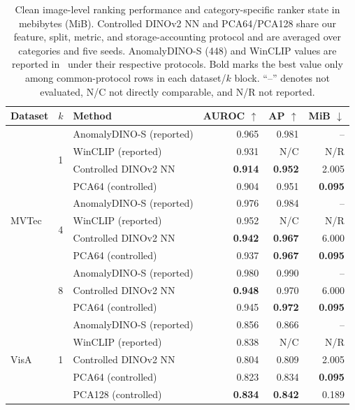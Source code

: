 \begin{table}[pos=t]
\centering
\caption{Clean image-level ranking performance and category-specific ranker state in mebibytes (MiB). Controlled DINOv2 NN and PCA64/PCA128 share our feature, split, metric, and storage-accounting protocol and are averaged over categories and five seeds. AnomalyDINO-S (448) and WinCLIP values are reported in~\cite{damm2025anomalydino,winclip2023} under their respective protocols. Bold marks the best value only among common-protocol rows in each dataset/$k$ block. ``--'' denotes not evaluated, N/C not directly comparable, and N/R not reported.}
\label{tab:clean-efficiency}
\setlength{\tabcolsep}{2.4pt}
\footnotesize
\begin{tabular}{lllrrr}
\toprule
Dataset & $k$ & Method & AUROC $\uparrow$ & AP $\uparrow$ & MiB $\downarrow$ \\
\midrule
\multirow{11}{*}{MVTec}
& \multirow{4}{*}{1} & AnomalyDINO-S (reported) & 0.965 & 0.981 & -- \\
& & WinCLIP (reported) & 0.931 & N/C & N/R \\
& & Controlled DINOv2 NN & \textbf{0.914} & \textbf{0.952} & 2.005 \\
& & PCA64 (controlled) & 0.904 & 0.951 & \textbf{0.095} \\
\cmidrule(lr){2-6}
& \multirow{4}{*}{4} & AnomalyDINO-S (reported) & 0.976 & 0.984 & -- \\
& & WinCLIP (reported) & 0.952 & N/C & N/R \\
& & Controlled DINOv2 NN & \textbf{0.942} & \textbf{0.967} & 6.000 \\
& & PCA64 (controlled) & 0.937 & \textbf{0.967} & \textbf{0.095} \\
\cmidrule(lr){2-6}
& \multirow{3}{*}{8} & AnomalyDINO-S (reported) & 0.980 & 0.990 & -- \\
& & Controlled DINOv2 NN & \textbf{0.948} & 0.970 & 6.000 \\
& & PCA64 (controlled) & 0.945 & \textbf{0.972} & \textbf{0.095} \\
\midrule
\multirow{14}{*}{VisA}
& \multirow{5}{*}{1} & AnomalyDINO-S (reported) & 0.856 & 0.866 & -- \\
& & WinCLIP (reported) & 0.838 & N/C & N/R \\
& & Controlled DINOv2 NN & 0.804 & 0.809 & 2.005 \\
& & PCA64 (controlled) & 0.823 & 0.834 & \textbf{0.095} \\
& & PCA128 (controlled) & \textbf{0.834} & \textbf{0.842} & 0.189 \\

\end{tabular}
\end{table}
